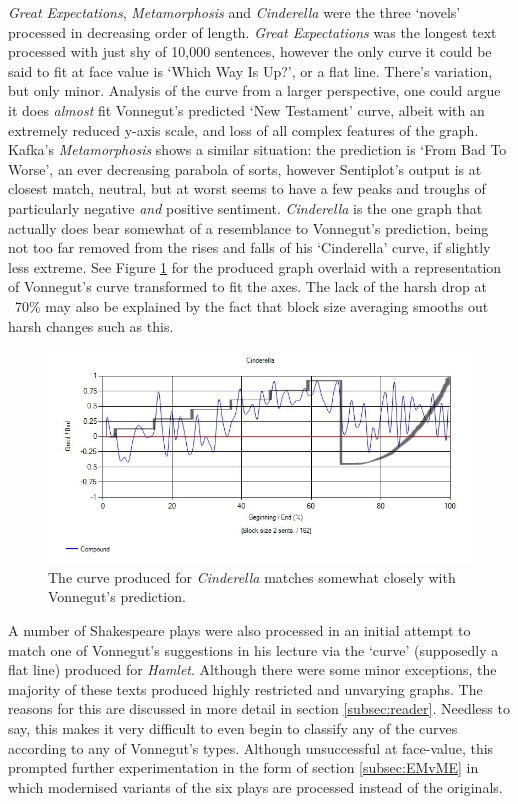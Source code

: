 \documentclass{article}
\begin{document}
{            \textit{Great Expectations}, \textit{Metamorphosis} and \textit{Cinderella} were the three `novels' processed in decreasing order of length. \textit{Great Expectations} was the longest text processed with just shy of 10,000 sentences, however the only curve it could be said to fit at face value is `Which Way Is Up?', or a flat line. There's variation, but only minor. Analysis of the curve from a larger perspective, one could argue it does \textit{almost} fit Vonnegut's predicted `New Testament' curve, albeit with an extremely reduced y-axis scale, and loss of all complex features of the graph. Kafka's \textit{Metamorphosis} shows a similar situation: the prediction is `From Bad To Worse', an ever decreasing parabola of sorts, however Sentiplot's output is at closest match, neutral, but at worst seems to have a few peaks and troughs of particularly negative \textit{and} positive sentiment. \textit{Cinderella} is the one graph that actually does bear somewhat of a resemblance to Vonnegut's prediction, being not too far removed from the rises and falls of his `Cinderella' curve, if slightly less extreme. See Figure \ref{fig:cinderellaComp} for the produced graph overlaid with a representation of Vonnegut's curve transformed to fit the axes. The lack of the harsh drop at ~70\% may also be explained by the fact that block size averaging smooths out harsh changes such as this.
            \begin{figure}[hbtp]
                \includegraphics[width=1\textwidth]{Figures/Curve/CinderellaComp}
                \centering
                \caption{The curve produced for \textit{Cinderella} matches somewhat closely with Vonnegut's prediction.} 
                \label{fig:cinderellaComp}
            \end{figure}
            A number of Shakespeare plays were also processed in an initial attempt to match one of Vonnegut's suggestions in his lecture via the `curve' (supposedly a flat line) produced for \textit{Hamlet}. Although there were some minor exceptions, the majority of these texts produced highly restricted and unvarying graphs. The reasons for this are discussed in more detail in section \ref{subsec:reader}. Needless to say, this makes it very difficult to even begin to classify any of the curves according to any of Vonnegut’s types. Although unsuccessful at face-value, this prompted further experimentation in the form of section \ref{subsec:EMvME} in which modernised variants of the six plays are processed instead of the originals.
}
\end{document}
